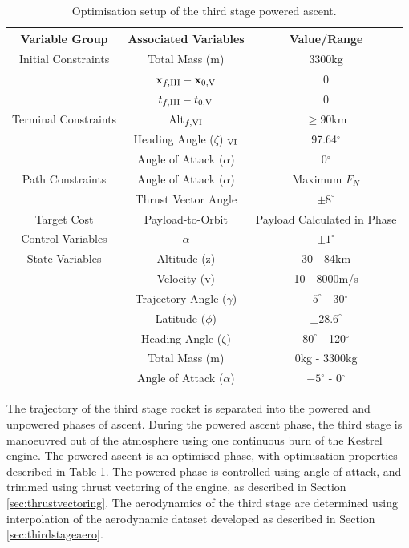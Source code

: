 \begin{table}[ht]
	\centering
	\begin{tabular}{|c|c|c|}
		\hline \textbf{Variable Group}  & \textbf{Associated Variables} & \textbf{Value/Range}\\	\hline Initial Constraints  & Total Mass (m) & 3300kg\\ 
		& $\textbf{x}_{f,\textrm{\rom{3}}} - \textbf{x}_{0,\textrm{\rom{5}}}$ & 0\\ & $t_{f,\textrm{\rom{3}}} - t_{0,\textrm{\rom{5}}}$ & 0\\
		\hline Terminal Constraints & Alt$_{f,\textrm{\rom{6}}}$ & $\geq$90km\\ & Heading Angle ($\zeta$) $_{\textrm{\rom{6}}}$ & 97.64$^\circ$\\  & Angle of Attack ($\alpha$) & 0$^\circ$\\
		\hline Path Constraints & Angle of Attack ($\alpha$) & Maximum $F_N$\\  & Thrust Vector Angle & $\pm8^\circ$\\ 
		\hline Target Cost & Payload-to-Orbit & Payload Calculated in Phase \rom{7}\\ 
		\hline Control Variables & $\dot{\alpha}$ & $\pm1^\circ$\\ 
		\hline State Variables & Altitude (z) & 30 - 84km\\ & Velocity (v)& 10 - 8000m/s\\ & Trajectory Angle ($\gamma$)& $-5^\circ$ - 30$^\circ$ \\   & Latitude ($\phi$) &$\pm28.6^\circ$ \\   & Heading Angle ($\zeta$)& $80^\circ$ - 120$^\circ$\\  & Total Mass (m)& 0kg - 3300kg \\  & Angle of Attack ($\alpha$)&  $-5^\circ$ - 0$^\circ$\\ 
		\hline 
	\end{tabular} 
	\caption{Optimisation setup of the third stage powered ascent.}
	\label{tab:thirdstageopt}
\end{table}

The trajectory of the third stage rocket is separated into the powered and unpowered phases of ascent.
During the powered ascent phase, the third stage is manoeuvred out of the atmosphere using one continuous burn of the Kestrel engine. The powered ascent is an optimised phase, with optimisation properties described in Table \ref{tab:thirdstageopt}. 
 The powered phase is controlled using angle of attack, and trimmed using thrust vectoring of the engine, as described in Section \ref{sec:thrustvectoring}. The aerodynamics of the third stage are determined using interpolation of the aerodynamic dataset developed as described in Section \ref{sec:thirdstageaero}.

